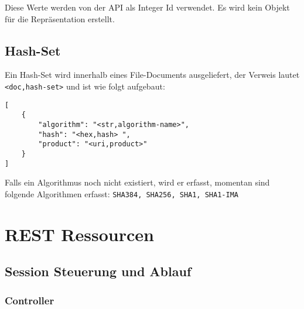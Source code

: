 \documentclass[10pt,a4paper]{scrartcl}
\begin{document}
Diese Werte werden von der API als Integer Id verwendet. Es wird kein Objekt für
die Repräsentation erstellt.

\subsection{Hash-Set}
Ein Hash-Set wird innerhalb eines File-Documents ausgeliefert, der Verweis lautet \texttt{<doc,hash-set>} und ist wie folgt aufgebaut:

\begin{lstlisting}
[
	{
		"algorithm": "<str,algorithm-name>",
		"hash": "<hex,hash>	",
		"product": "<uri,product>"
	}
]
\end{lstlisting}

Falls ein Algorithmus noch nicht existiert, wird er erfasst, momentan sind folgende Algorithmen erfasst: 
\texttt{SHA384, SHA256, SHA1, SHA1-IMA}


\pagebreak


\section{REST Ressourcen}

\subsection{Session Steuerung und Ablauf}

\subsubsection{Controller}
\end{document}
